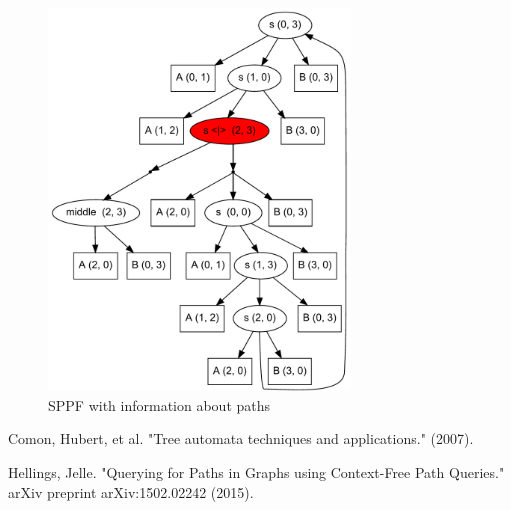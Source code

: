 \documentclass{sig-alternate}
\begin{document}
\begin{figure}[h]
    \begin{center}
        \includegraphics[width=8cm]{AnBn.pdf}
        \caption{SPPF with information about paths}
        \label{SPPF2}        
    \end{center}
\end{figure}



\begin{thebibliography}{9}

  Comon, Hubert, et al. "Tree automata techniques and applications." (2007).

Hellings, Jelle. "Querying for Paths in Graphs using Context-Free Path Queries." arXiv preprint arXiv:1502.02242 (2015).

\end{thebibliography}
\end{document}
